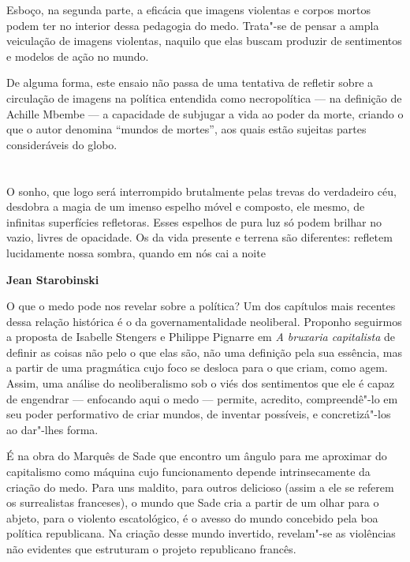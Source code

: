 Esboço, na segunda parte, a eficácia que imagens violentas e corpos
mortos podem ter no interior dessa pedagogia do medo. Trata"-se de pensar
a ampla veiculação de imagens violentas, naquilo que elas buscam
produzir de sentimentos e modelos de ação no mundo.

De alguma forma, este ensaio não
passa de uma tentativa de refletir sobre a circulação de imagens na política
entendida como necropolítica --- na definição de Achille Mbembe --- a capacidade de subjugar a vida ao poder da morte, criando o
que o autor denomina ``mundos de mortes'', aos quais estão sujeitas partes
consideráveis do globo.

\pagebreak

\section*{}

\epigraph{\Formular\scriptsize{O sonho, que logo será interrompido brutalmente pelas trevas do
verdadeiro céu, desdobra a magia de um imenso espelho móvel e composto,
ele mesmo, de infinitas superfícies refletoras. Esses espelhos de pura
luz só podem brilhar no vazio, livres de opacidade. Os da vida presente
e terrena são diferentes: refletem lucidamente nossa sombra, quando em
nós cai a noite}}{\Formular\scriptsize\textbf{Jean Starobinski}}

O que o medo pode nos revelar sobre a política? Um dos capítulos mais
recentes dessa relação histórica é o da governamentalidade neoliberal.
Proponho seguirmos a proposta de Isabelle Stengers e Philippe Pignarre em
\emph{A bruxaria capitalista} de definir as coisas não pelo o que elas
são, não uma definição pela sua essência, mas a partir de uma pragmática
cujo foco se desloca para o que criam, como agem. Assim, uma análise do
neoliberalismo sob o viés dos sentimentos que ele é capaz de engendrar ---
enfocando aqui o medo --- permite, acredito, compreendê"-lo em seu poder performativo de criar mundos, de inventar possíveis, e concretizá"-los ao dar"-lhes forma.

\asterisc

É na obra do Marquês de Sade que encontro um ângulo para me aproximar
do capitalismo como máquina cujo funcionamento depende intrinsecamente
da criação do medo. Para uns maldito, para outros delicioso (assim a ele
se referem os surrealistas franceses), o mundo que Sade cria a partir de
um olhar para o abjeto, para o violento escatológico, é o avesso do
mundo concebido pela boa política republicana. Na criação desse
mundo invertido, revelam"-se as violências não evidentes que estruturam o projeto
republicano francês.


